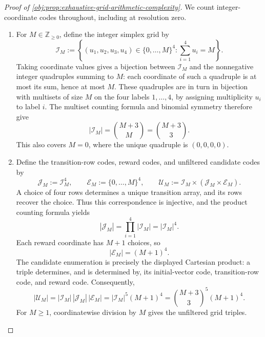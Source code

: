 \begin{proof}[Proof of \cref{obj:prop:exhaustive-grid-arithmetic-complexity}]
We count integer-coordinate codes throughout, including at resolution zero.
\begin{enumerate}
\item For \(M\in\mathbb Z_{\ge0}\), define the integer simplex grid by
\[
\mathcal I_M
:=
\left\{
(u_1,u_2,u_3,u_4)\in\{0,\ldots,M\}^{4}:
\sum_{i=1}^{4}u_i=M
\right\}.
\]
Taking coordinate values gives a bijection between \(\mathcal I_M\) and the nonnegative integer quadruples summing to \(M\): each coordinate of such a quadruple is at most its sum, hence at most \(M\). These quadruples are in turn in bijection with multisets of size \(M\) on the four labels \(1,\ldots,4\), by assigning multiplicity \(u_i\) to label \(i\). The multiset counting formula and binomial symmetry therefore give
\[
|\mathcal I_M|
=
\binom{M+3}{M}
=
\binom{M+3}{3}.
\]
This also covers \(M=0\), where the unique quadruple is \((0,0,0,0)\).

\item Define the transition-row codes, reward codes, and unfiltered candidate codes by
\[
\mathcal J_M:=\mathcal I_M^{4},
\qquad
\mathcal E_M:=\{0,\ldots,M\}^{4},
\qquad
\mathcal U_M:=\mathcal I_M\times
   (\mathcal J_M\times\mathcal E_M).
\]
A choice of four rows determines a unique transition array, and its rows recover the choice. Thus this correspondence is injective, and the product counting formula yields
\[
|\mathcal J_M|
=
\prod_{i=1}^{4}|\mathcal I_M|
=
|\mathcal I_M|^{4}.
\]
Each reward coordinate has \(M+1\) choices, so
\[
|\mathcal E_M|=(M+1)^4.
\]
The candidate enumeration is precisely the displayed Cartesian product: a triple determines, and is determined by, its initial-vector code, transition-row code, and reward code. Consequently,
\[
|\mathcal U_M|
=
|\mathcal I_M|\,|\mathcal J_M|\,|\mathcal E_M|
=
|\mathcal I_M|^{5}(M+1)^4
=
\binom{M+3}{3}^{5}(M+1)^4.
\]
For \(M\ge1\), coordinatewise division by \(M\) gives the unfiltered grid triples.


\end{enumerate}
\end{proof}

